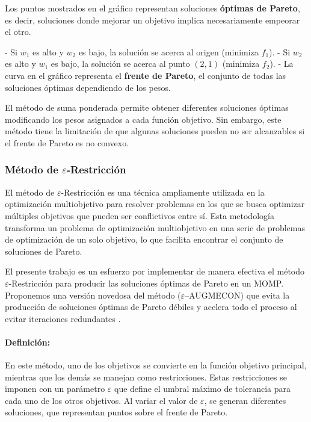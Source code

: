 \documentclass[12pt]{article}
\begin{document}
Los puntos mostrados en el gráfico representan soluciones \textbf{óptimas de Pareto}, es decir, soluciones donde mejorar un objetivo implica necesariamente empeorar el otro.  

- Si \( w_1 \) es alto y \( w_2 \) es bajo, la solución se acerca al origen (minimiza \( f_1 \)).
- Si \( w_2 \) es alto y \( w_1 \) es bajo, la solución se acerca al punto \( (2,1) \) (minimiza \( f_2 \)).
- La curva en el gráfico representa el \textbf{frente de Pareto}, el conjunto de todas las soluciones óptimas dependiendo de los pesos.

El método de suma ponderada permite obtener diferentes soluciones óptimas modificando los pesos asignados a cada función objetivo. Sin embargo, este método tiene la limitación de que algunas soluciones pueden no ser alcanzables si el frente de Pareto es no convexo.


\subsubsection{Método de $\varepsilon$-Restricción}

El método de $\varepsilon$-Restricción es una técnica ampliamente utilizada en la optimización multiobjetivo para resolver problemas en los que se busca optimizar múltiples objetivos que pueden ser conflictivos entre sí. Esta metodología transforma un problema de optimización multiobjetivo en una serie de problemas de optimización de un solo objetivo, lo que facilita encontrar el conjunto de soluciones de Pareto.

El presente trabajo es un esfuerzo por implementar de manera efectiva el método $\varepsilon$-Restricción para producir las soluciones óptimas de Pareto en un MOMP. Proponemos una versión novedosa del método ($\varepsilon$–AUGMECON) que evita la producción de soluciones óptimas de Pareto débiles y acelera todo el proceso al evitar iteraciones redundantes \cite{Mavrotas2009}.

\paragraph{Definición:}
En este método, uno de los objetivos se convierte en la función objetivo principal, mientras que los demás se manejan como restricciones. Estas restricciones se imponen con un parámetro $\varepsilon$ que define el umbral máximo de tolerancia para cada uno de los otros objetivos. Al variar el valor de $\varepsilon$, se generan diferentes soluciones, que representan puntos sobre el frente de Pareto. 
\end{document}
